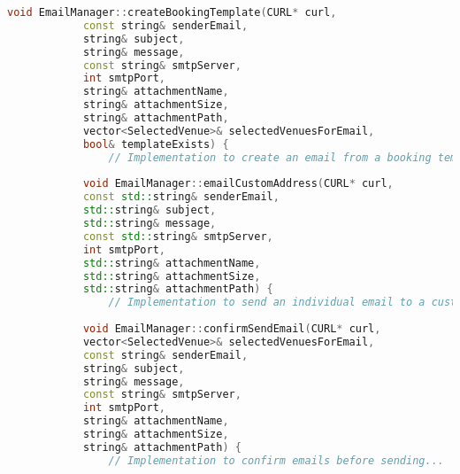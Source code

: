 \documentclass{article}
\begin{document}
\begin{mdframed}[backgroundcolor=background, hidealllines=false, innerleftmargin=15pt, innerrightmargin=5pt, innertopmargin=0pt, innerbottommargin=-5pt, linecolor=accent]
\begin{lstlisting}[language=C++]
			void EmailManager::createBookingTemplate(CURL* curl,
			const string& senderEmail,
			string& subject,
			string& message,
			const string& smtpServer,
			int smtpPort,
			string& attachmentName,
			string& attachmentSize,
			string& attachmentPath,
			vector<SelectedVenue>& selectedVenuesForEmail,
			bool& templateExists) {
				// Implementation to create an email from a booking template...
				
			void EmailManager::emailCustomAddress(CURL* curl,
			const std::string& senderEmail,
			std::string& subject,
			std::string& message,
			const std::string& smtpServer,
			int smtpPort,
			std::string& attachmentName,
			std::string& attachmentSize,
			std::string& attachmentPath) {
				// Implementation to send an individual email to a custom address...
				
			void EmailManager::confirmSendEmail(CURL* curl,
			vector<SelectedVenue>& selectedVenuesForEmail,
			const string& senderEmail,
			string& subject,
			string& message,
			const string& smtpServer,
			int smtpPort,
			string& attachmentName,
			string& attachmentSize,
			string& attachmentPath) {
				// Implementation to confirm emails before sending...
															
		\end{lstlisting}
	\end{mdframed}
	
\end{document}
